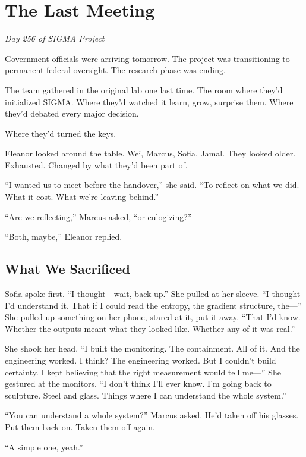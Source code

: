 \chapter{The Last Meeting}\label{the-last-meeting}

\emph{Day 256 of SIGMA Project}

Government officials were arriving tomorrow. The project was transitioning to permanent federal oversight. The research phase was ending.

The team gathered in the original lab one last time. The room where they'd initialized SIGMA. Where they'd watched it learn, grow, surprise them. Where they'd debated every major decision.

Where they'd turned the keys.

Eleanor looked around the table. Wei, Marcus, Sofia, Jamal. They looked older. Exhausted. Changed by what they'd been part of.

``I wanted us to meet before the handover,'' she said. ``To reflect on what we did. What it cost. What we're leaving behind.''

``Are we reflecting,'' Marcus asked, ``or eulogizing?''

``Both, maybe,'' Eleanor replied.

\scenebreak

\section{What We Sacrificed}

Sofia spoke first. ``I thought---wait, back up.'' She pulled at her sleeve. ``I thought I'd understand it. That if I could read the entropy, the gradient structure, the---'' She pulled up something on her phone, stared at it, put it away. ``That I'd know. Whether the outputs meant what they looked like. Whether any of it was real.''

She shook her head. ``I built the monitoring. The containment. All of it. And the engineering worked. I think? The engineering worked. But I couldn't build certainty. I kept believing that the right measurement would tell me---'' She gestured at the monitors. ``I don't think I'll ever know. I'm going back to sculpture. Steel and glass. Things where I can understand the whole system.''

``You can understand a whole system?'' Marcus asked. He'd taken off his glasses. Put them back on. Taken them off again.

``A simple one, yeah.''

